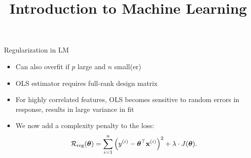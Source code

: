 \documentclass[11pt,compress,t,notes=noshow, xcolor=table]{beamer}
\title{Introduction to Machine Learning}
\begin{document}



\begin{vbframe}{Regularization in LM}

  \begin{itemize} \setlength{\itemsep}{1.3em}
  \item Can also overfit if $p$ large and $n$ small(er)
  \item OLS estimator requires full-rank design matrix
  \item For highly correlated features, OLS becomes sensitive to random errors in response, results in large variance in fit
  \item We now add a complexity penalty to the loss:
  $$
  \mathcal{R}_{\text{reg}}(\bm{\theta}) = \sum\limits_{i=1}^n \left(y^{(i)} - \bm{\theta}^\top \mathbf{x}^{(i)} \right)^2 + \lambda \cdot J(\bm{\theta}). 
  $$ 
  \end{itemize}

\end{vbframe}






\end{document}
